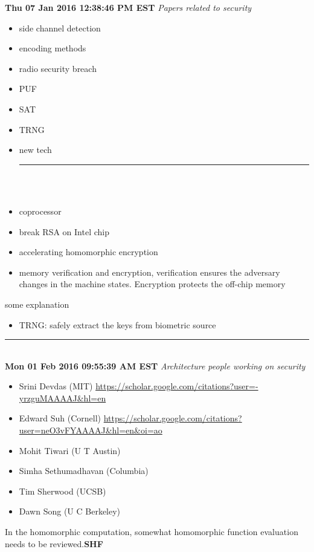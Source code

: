 \documentclass[]{article}
\begin{document}
\noindent \textbf{Thu 07 Jan 2016 12:38:46 PM EST}
\textit{Papers related to security}
\begin{itemize}
	\item side channel detection \cite{longo2015soc} 
	\item encoding methods \cite{chakraborti2015trivia} 
	\item radio security breach \cite{genkin2015stealing}
	\item PUF \cite{aysu2015end} \cite{maes2015secure} \cite{herder2014physical} \cite{devadas2010secure}
	\item SAT \cite{saha2015improved}
	\item TRNG \cite{haddad2015physical}\cite{suh2007physical}\cite{herder2014trapdoor}
	\item new tech \cite{suh2003efficient}
	
\rule[-0.1cm]{7.5in}{0.01cm}\\
\\
	\item coprocessor \cite{roy2015lightweight} 
	\item break RSA on Intel chip \cite{bhattacharya2015watches}
	\item accelerating homomorphic encryption \cite{doroz2015accelerating}
	\item memory verification and encryption, verification ensures the
adversary changes in the machine states. Encryption protects the off-chip
memory\cite{suh2003efficient}

\end{itemize}

some explanation
\begin{itemize}
	\item \cite{herder2014trapdoor}TRNG: safely extract the keys from biometric source
\end{itemize}

\rule[-0.1cm]{7.5in}{0.01cm}\\
\noindent \textbf{Mon 01 Feb 2016 09:55:39 AM EST}
\textit{Architecture people working on security}

\begin{itemize}
	\item Srini Devdas (MIT) \url{https://scholar.google.com/citations?user=-yrzguMAAAAJ&hl=en}
	\item Edward Suh (Cornell) \url{https://scholar.google.com/citations?user=neO3vFYAAAAJ&hl=en&oi=ao}
	\item Mohit Tiwari (U T Austin)
	\item Simha Sethumadhavan (Columbia)
	\item Tim Sherwood (UCSB)
	\item Dawn Song (U C Berkeley)
\end{itemize}

In the homomorphic computation, somewhat homomorphic function evaluation needs to be reviewed.\textbf{SHF}


{}

\end{document}
